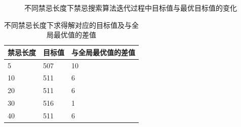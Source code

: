 \documentclass{article}
\begin{document}
    \begin{figure}[H]
        \centering
        \quad
        \caption{不同禁忌长度下禁忌搜索算法迭代过程中目标值与最优目标值的变化}
        \label{fig:diff}
    \end{figure}

    \begin{table}
    	\centering
        \begin{tabular}{lll}
            \toprule
            禁忌长度&目标值&与全局最优值的差值\\
            \midrule
            5&507&10\\
            10&511&6\\
            20&511&6\\
            30&516&1\\
            40&511&6\\
            \bottomrule
        \end{tabular}
        \caption{不同禁忌长度下求得解对应的目标值及与全局最优值的差值}
        \label{table:tabu}
    \end{table}
\end{document}
